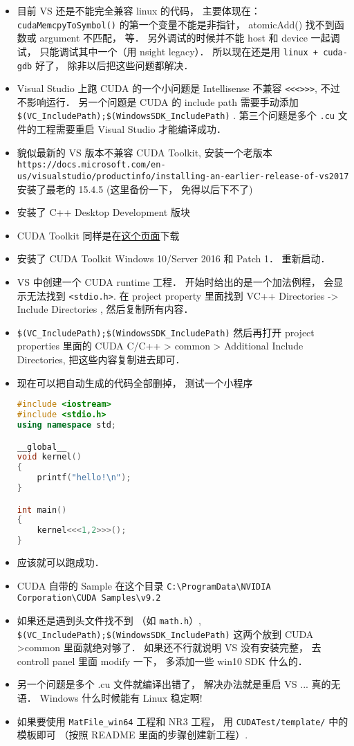
\begin{itemize}
\item 目前 VS 还是不能完全兼容 linux 的代码， 主要体现在： \verb|cudaMemcpyToSymbol()| 的第一个变量不能是非指针， atomicAdd() 找不到函数或 argument 不匹配， 等． 另外调试的时候并不能 host 和 device 一起调试， 只能调试其中一个（用 nsight legacy）． 所以现在还是用 \verb|linux + cuda-gdb| 好了， 除非以后把这些问题都解决．
\item Visual Studio 上跑 CUDA 的一个小问题是 Intellisense 不兼容 \verb`<<<>>>`, 不过不影响运行． 另一个问题是 CUDA 的 include path 需要手动添加 \verb`$(VC_IncludePath);$(WindowsSDK_IncludePath)` . 第三个问题是多个 \verb`.cu` 文件的工程需要重启 Visual Studio 才能编译成功．
\item 貌似最新的 VS 版本不兼容 CUDA Toolkit, 安装一个老版本 \verb|https://docs.microsoft.com/en-us/visualstudio/productinfo/installing-an-earlier-release-of-vs2017| 安装了最老的 15.4.5 (这里备份一下， 免得以后下不了)
\item 安装了 C++ Desktop Development 版块
\item CUDA Toolkit 同样是在\href{https://developer.nvidia.com/cuda-downloads}{这个页面}下载
\item 安装了 CUDA Toolkit Windows 10/Server 2016 和 Patch 1． 重新启动．
\item VS 中创建一个 CUDA runtime 工程． 开始时给出的是一个加法例程， 会显示无法找到 \verb`<stdio.h>`. 在 project property 里面找到 VC++ Directories -> Include Directories , 然后复制所有内容．
\item \verb|$(VC_IncludePath);$(WindowsSDK_IncludePath)| 然后再打开 project properties 里面的 CUDA C/C++ >  common > Additional Include Directories, 把这些内容复制进去即可．
\item 现在可以把自动生成的代码全部删掉， 测试一个小程序
\begin{lstlisting}[language=cpp]
#include <iostream>
#include <stdio.h>
using namespace std;

__global__
void kernel()
{
	printf("hello!\n");
}

int main()
{
	kernel<<<1,2>>>();
}
\end{lstlisting}
\item 应该就可以跑成功．
\item CUDA 自带的 Sample 在这个目录 \verb|C:\ProgramData\NVIDIA Corporation\CUDA Samples\v9.2|
\item 如果还是遇到头文件找不到 （如 \verb`math.h`）, \verb`$(VC_IncludePath);$(WindowsSDK_IncludePath)` 这两个放到 CUDA >common 里面就绝对够了． 如果还不行就说明 VS 没有安装完整， 去 controll panel 里面 modify 一下， 多添加一些 win10 SDK 什么的．
\item 另一个问题是多个 .cu 文件就编译出错了， 解决办法就是重启 VS ... 真的无语． Windows 什么时候能有 Linux 稳定啊!
\item 如果要使用 \verb|MatFile_win64| 工程和 NR3 工程， 用 \verb|CUDATest/template/| 中的模板即可 （按照 README 里面的步骤创建新工程）.
\end{itemize}
